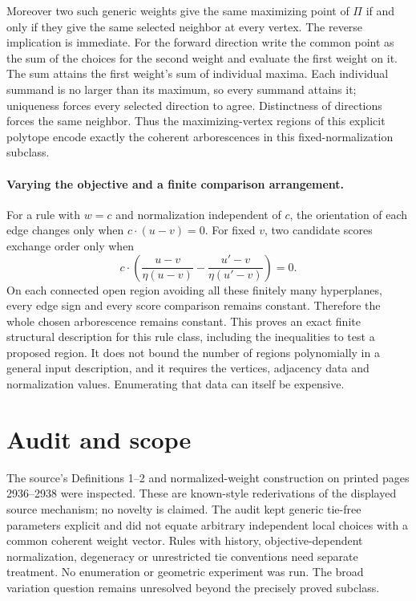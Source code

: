\documentclass[11pt]{article}
\begin{document}
Moreover two such generic weights give the same maximizing point
of $\Pi$ if and only if they give the same selected neighbor
at every vertex. The reverse implication is immediate. For the
forward direction write the common point as the sum of the choices
for the second weight and evaluate the first weight on it. The
sum attains the first weight's sum of individual maxima. Each
individual summand is no larger than its maximum, so every summand
attains it; uniqueness forces every selected direction to agree.
Distinctness of directions forces the same neighbor. Thus the
maximizing-vertex regions of this explicit polytope encode exactly
the coherent arborescences in this fixed-normalization subclass.

\paragraph{Varying the objective and a finite comparison arrangement.}
For a rule with $w=c$ and normalization independent of $c$,
the orientation of each edge changes only when $c\cdot(u-v)=0$.
For fixed $v$, two candidate scores exchange order only when
\[
c\cdot\left(\frac{u-v}{\eta(u-v)}-
             \frac{u'-v}{\eta(u'-v)}\right)=0.
\]
On each connected open region avoiding all these finitely many
hyperplanes, every edge sign and every score comparison remains
constant. Therefore the whole chosen arborescence remains constant.
This proves an exact finite structural description for this rule
class, including the inequalities to test a proposed region. It
does not bound the number of regions polynomially in a general
input description, and it requires the vertices, adjacency data and
normalization values. Enumerating that data can itself be expensive.

\section{Audit and scope}
The source's Definitions 1--2 and normalized-weight construction on
printed pages 2936--2938 were inspected. These are known-style
rederivations of the displayed source mechanism; no novelty is claimed.
The audit kept generic tie-free parameters explicit and did not
equate arbitrary independent local choices with a common coherent
weight vector. Rules with history, objective-dependent normalization,
degeneracy or unrestricted tie conventions need separate treatment.
No enumeration or geometric experiment was run. The broad variation
question remains unresolved beyond the precisely proved subclass.
\end{document}
